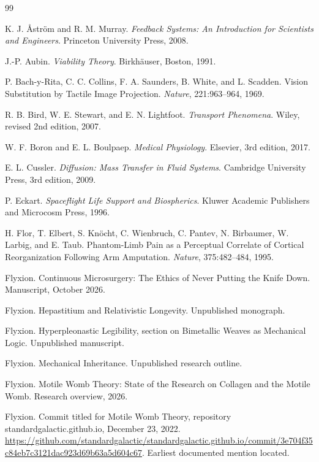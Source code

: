 \documentclass[11pt,openany]{book}
\theoremstyle{definition}
\theoremstyle{remark}
\begin{document}
\begin{thebibliography}{99}

 K. J. {\AA}str{\"o}m and R. M. Murray. \emph{Feedback Systems: An Introduction for Scientists and Engineers}. Princeton University Press, 2008.

 J.-P. Aubin. \emph{Viability Theory}. Birkh{\"a}user, Boston, 1991.

 P. Bach-y-Rita, C. C. Collins, F. A. Saunders, B. White, and L. Scadden. Vision Substitution by Tactile Image Projection. \emph{Nature}, 221:963--964, 1969.

 R. B. Bird, W. E. Stewart, and E. N. Lightfoot. \emph{Transport Phenomena}. Wiley, revised 2nd edition, 2007.

 W. F. Boron and E. L. Boulpaep. \emph{Medical Physiology}. Elsevier, 3rd edition, 2017.

 E. L. Cussler. \emph{Diffusion: Mass Transfer in Fluid Systems}. Cambridge University Press, 3rd edition, 2009.

 P. Eckart. \emph{Spaceflight Life Support and Biospherics}. Kluwer Academic Publishers and Microcosm Press, 1996.

 H. Flor, T. Elbert, S. Kn{\"o}cht, C. Wienbruch, C. Pantev, N. Birbaumer, W. Larbig, and E. Taub. Phantom-Limb Pain as a Perceptual Correlate of Cortical Reorganization Following Arm Amputation. \emph{Nature}, 375:482--484, 1995.

 Flyxion. Continuous Microsurgery: The Ethics of Never Putting the Knife Down. Manuscript, October 2026.

 Flyxion. Hepastitium and Relativistic Longevity. Unpublished monograph.

 Flyxion. Hyperpleonastic Legibility, section on Bimetallic Weaves as Mechanical Logic. Unpublished manuscript.

 Flyxion. Mechanical Inheritance. Unpublished research outline.

 Flyxion. Motile Womb Theory: State of the Research on Collagen and the Motile Womb. Research overview, 2026.

 Flyxion. Commit titled for Motile Womb Theory, repository standardgalactic.github.io, December 23, 2022. \url{https://github.com/standardgalactic/standardgalactic.github.io/commit/3e704f35c84eb7c3121dac923d69b63a5d604c67}. Earliest documented mention located.


\end{thebibliography}
\end{document}
